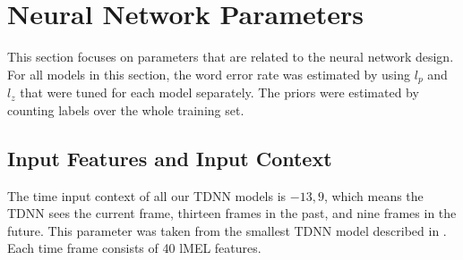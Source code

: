 \section{Neural Network Parameters}
This section focuses on parameters that are related to the neural network design. For all models in this section, the word error rate was estimated by using $l_p$ and $l_z$ that were tuned for each model separately. The priors were estimated by counting labels over the whole training set.
\subsection{Input Features and Input Context}
The time input context of all our TDNN models is ${-13,9}$, which means the TDNN sees the current frame, thirteen frames in the past, and nine frames in the future. This parameter was taken from the smallest TDNN model described in \cite{peddinti2015reverberation}.
Each time frame consists of 40 lMEL features. 
